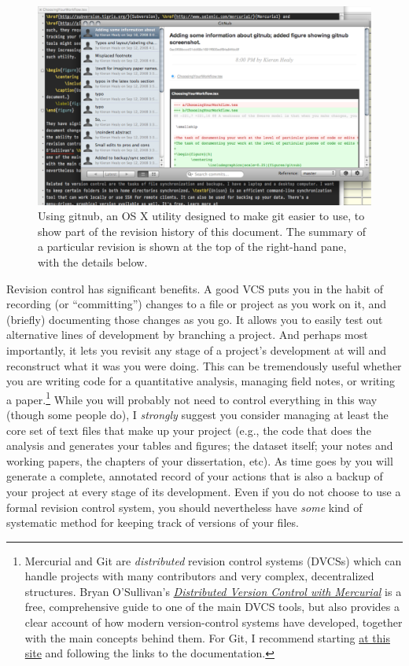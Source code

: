 \documentclass[11pt,article,oneside]{memoir}
\begin{document}
\begin{figure}[h]
	\centering
		\includegraphics[scale=0.33]{figures/gitnub}
	\caption{Using gitnub, an OS X utility designed to make git easier to use, to show part of the revision history of this document. The summary of a particular revision is shown at the top of the right-hand pane, with the details below.}
	\label{fig:gitnub}
\end{figure}

Revision control has significant benefits. A good VCS puts you in the habit of recording (or ``committing'') changes to a file or project as you work on it, and (briefly) documenting those changes as you go. It allows you to easily test out alternative lines of development by branching a project. And perhaps most importantly, it lets you revisit any stage of a project's development at will and reconstruct what it was you were doing. This can be tremendously useful whether you are writing code for a quantitative analysis, managing field notes, or writing a paper.\footnote{Mercurial and Git are \emph{distributed} revision control systems (DVCSs) which can handle projects with many contributors and very complex, decentralized structures. Bryan O'Sullivan's \href{http://hgbook.red-bean.com/hgbook.pdf}{\emph{Distributed Version Control with Mercurial}} is a free, comprehensive guide to one of the main DVCS tools, but also provides a clear account of how modern version-control systems have developed, together with the main concepts behind them. For Git, I recommend starting \href{http://git-scm.com/}{at this site} and following the links to the documentation.} While you will probably not need to control everything in this way (though some people do), I \emph{strongly} suggest you consider managing at least the core set of text files that make up your project (e.g., the code that does the analysis and generates your tables and figures; the dataset itself; your notes and working papers, the chapters of your dissertation, etc). As time goes by you will generate a complete, annotated  record of your actions that is also a backup of your project at every stage of its development. Even if you do not choose to use a formal revision control system, you should nevertheless have \emph{some} kind of systematic method for keeping track of versions of your files. 
\end{document}
